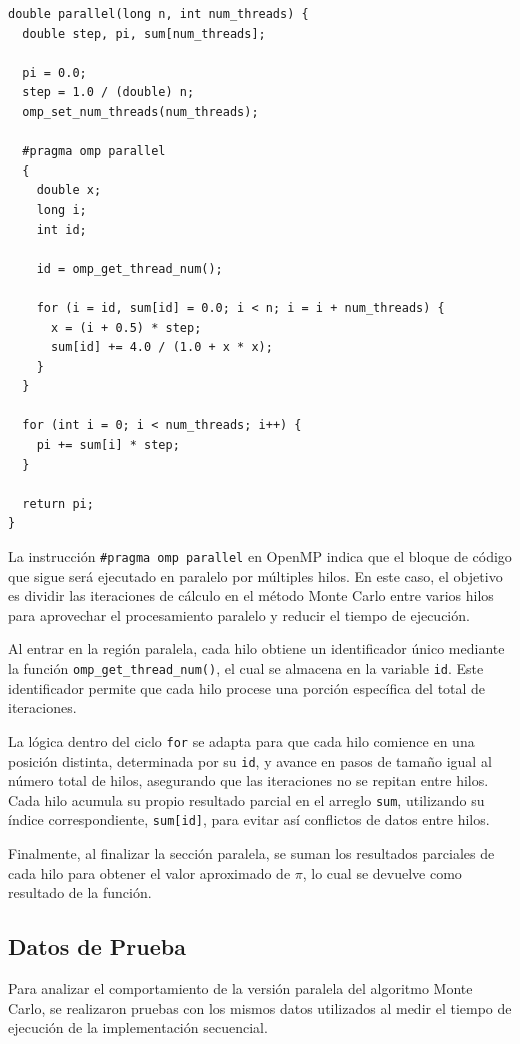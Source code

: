 \documentclass[a4paper, 10pt, onecolumn]{IEEEtran}
\begin{document}
\begin{lstlisting}[caption={Implementación Paralela de Monte Carlo en C++}, label={lst:parallel}]
double parallel(long n, int num_threads) {
  double step, pi, sum[num_threads];
  
  pi = 0.0;
  step = 1.0 / (double) n;
  omp_set_num_threads(num_threads);
  
  #pragma omp parallel
  {
    double x;
    long i;
    int id;
    
    id = omp_get_thread_num();
    
    for (i = id, sum[id] = 0.0; i < n; i = i + num_threads) {
      x = (i + 0.5) * step;
      sum[id] += 4.0 / (1.0 + x * x);
    }
  }
  
  for (int i = 0; i < num_threads; i++) {
    pi += sum[i] * step;
  }
  
  return pi;
}
\end{lstlisting}

La instrucción \texttt{\#pragma omp parallel} en OpenMP indica que el bloque de código que sigue será ejecutado en paralelo por múltiples hilos. En este caso, el objetivo es dividir las iteraciones de cálculo en el método Monte Carlo entre varios hilos para aprovechar el procesamiento paralelo y reducir el tiempo de ejecución.

Al entrar en la región paralela, cada hilo obtiene un identificador único mediante la función \texttt{omp\_get\_thread\_num()}, el cual se almacena en la variable \texttt{id}. Este identificador permite que cada hilo procese una porción específica del total de iteraciones.

La lógica dentro del ciclo \texttt{for} se adapta para que cada hilo comience en una posición distinta, determinada por su \texttt{id}, y avance en pasos de tamaño igual al número total de hilos, asegurando que las iteraciones no se repitan entre hilos. Cada hilo acumula su propio resultado parcial en el arreglo \texttt{sum}, utilizando su índice correspondiente, \texttt{sum[id]}, para evitar así conflictos de datos entre hilos.

Finalmente, al finalizar la sección paralela, se suman los resultados parciales de cada hilo para obtener el valor aproximado de $\pi$, lo cual se devuelve como resultado de la función.

\subsection{Datos de Prueba}
Para analizar el comportamiento de la versión paralela del algoritmo Monte Carlo, se realizaron pruebas con los mismos datos utilizados al medir el tiempo de ejecución de la implementación secuencial.
\end{document}
